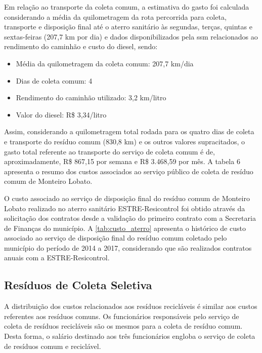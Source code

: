 Em relação ao transporte da coleta comum, a estimativa do gasto foi calculada considerando a média da quilometragem da rota percorrida para coleta, transporte e disposição final até o aterro sanitário às segundas, terças, quintas e sextas-feiras (207,7 km por dia) e dados disponibilizados pela \gls{ssm} relacionados ao rendimento do caminhão e custo do diesel, sendo:

\begin{itemize}
	\item Média da quilometragem da coleta comum: 207,7 km/dia
	\item Dias de coleta comum: 4
	\item Rendimento do caminhão utilizado: 3,2 km/litro
	\item Valor do diesel: R\$ 3,34/litro
\end{itemize} 

Assim, considerando a quilometragem total rodada para os quatro dias de coleta e transporte do resíduo comum (830,8 km) e os outros valores supracitados, o gasto total referente ao transporte do serviço de coleta comum é de, aproximadamente, R\$ 867,15 por semana e R\$ 3.468,59 por mês. A tabela 6 apresenta o resumo dos custos associados ao serviço público de coleta de resíduo comum de Monteiro Lobato.




O custo associado ao serviço de disposição final do resíduo comum de Monteiro Lobato realizado no aterro sanitário ESTRE-Resicontrol foi obtido através da solicitação dos contratos desde a validação do primeiro contrato com a Secretaria de Finanças do município. A \autoref{tab:custo_aterro} apresenta o histórico de custo associado ao serviço de disposição final do resíduo comum coletado pelo município do período de 2014 a 2017, considerando que são realizados contratos anuais com a ESTRE-Resicontrol.



\subsection{Resíduos de Coleta Seletiva}
A distribuição dos custos relacionados aos resíduos recicláveis é similar aos custos referentes aos resíduos comuns. Os funcionários responsáveis pelo serviço de coleta de resíduos recicláveis são os mesmos para a coleta de resíduo comum. Desta forma, o salário destinado aos três funcionários engloba o serviço de coleta de resíduos comum e reciclável.


